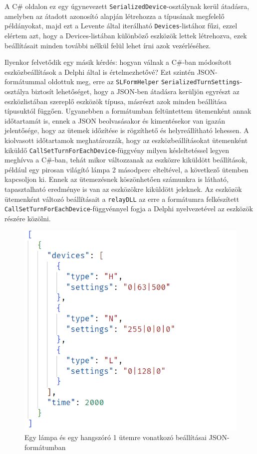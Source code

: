 \documentclass[tocnopagenum]{thesis-ekf}
\begin{document}
		A C\# oldalon ez egy úgynevezett \verb*|SerializedDevice|-osztálynak kerül átadásra, amelyben az átadott azonosító alapján létrehozza a típusának megfelelő példányokat, majd ezt a Levente által iterálható \verb*|Devices|-listához fűzi, ezzel elértem azt, hogy a Devices-listában különböző eszközök lettek létrehozva, ezek beállításait minden további nélkül felül lehet írni azok vezérléséhez.
	
		Ilyenkor felvetődik egy másik kérdés: hogyan válnak a C\#-ban módosított eszközbeállítások a Delphi által is értelmezhetővé? Ezt szintén JSON-formátummal oldottuk meg, erre az \verb*|SLFormHelper| \verb*|SerializedTurnSettings|-osztálya biztosít lehetőséget, hogy a JSON-ben átadásra kerüljön egyrészt az eszközlistában szereplő eszközök típusa, másrészt azok minden beállítása típusuktól függően. Ugyanebben a formátumban feltüntettem ütemenként annak időtartamát is, ennek a JSON beolvasásakor és kimentésekor van igazán jelentősége, hogy az ütemek időzítése is rögzíthető és helyreállítható lehessen. A kiolvasott időtartamok meghatározzák, hogy az eszközbeállításokat ütemenként kiküldő \verb*|CallSetTurnForEachDevice|-függvény milyen késleltetéssel legyen meghívva a C\#-ban, tehát mikor változzanak az eszközre kiküldött beállítások, például egy pirosan világító lámpa 2 másodperc elteltével, a következő ütemben kapcsoljon ki. Ennek az ütemezésnek köszönhetően számunkra is látható, tapasztalható eredménye is van az eszközökre kiküldött jeleknek.
		Az eszközök ütemenként változó beállításait a \verb*|relayDLL| az erre a formátumra felkészített \verb*|CallSetTurnForEachDevice|-függvénnyel fogja a Delphi nyelvezetével az eszközök részére közölni.
	\begin{figure}[H]
		\centering
		\includegraphics[scale=0.6]{images/json_szerializalas_utemek.PNG}
		\caption{Egy lámpa és egy hangszóró 1 ütemre vonatkozó beállításai JSON-formátumban}
		\label{fig:json_settings}
	\end{figure}	
	
\end{document}
